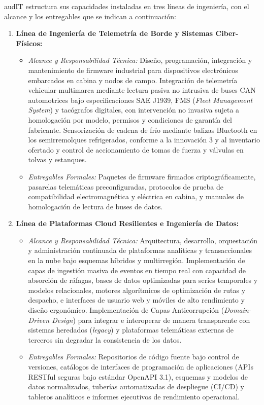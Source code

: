 audIT estructura sus capacidades instaladas en tres líneas de ingeniería, con el alcance y los entregables que se indican a continuación:

\begin{enumerate}
  \item \textbf{Línea de Ingeniería de Telemetría de Borde y Sistemas Ciber-Físicos:}
  \begin{itemize}
    \item \textit{Alcance y Responsabilidad Técnica:} Diseño, programación, integración y mantenimiento de firmware industrial para dispositivos electrónicos embarcados en cabina y nodos de campo. Integración de telemetría vehicular multimarca mediante lectura pasiva no intrusiva de buses CAN automotrices bajo especificaciones SAE J1939, FMS (\textit{Fleet Management System}) y tacógrafos digitales, con intervención no invasiva sujeta a homologación por modelo, permisos y condiciones de garantía del fabricante. Sensorización de cadena de frío mediante balizas Bluetooth en los semirremolques refrigerados, conforme a la innovación 3 y al inventario ofertado y control de accionamiento de tomas de fuerza y válvulas en tolvas y estanques.
    \item \textit{Entregables Formales:} Paquetes de firmware firmados criptográficamente, pasarelas telemáticas preconfiguradas, protocolos de prueba de compatibilidad electromagnética y eléctrica en cabina, y manuales de homologación de lectura de buses de datos.
  \end{itemize}

  \item \textbf{Línea de Plataformas Cloud Resilientes e Ingeniería de Datos:}
  \begin{itemize}
    \item \textit{Alcance y Responsabilidad Técnica:} Arquitectura, desarrollo, orquestación y administración continuada de plataformas analíticas y transaccionales en la nube bajo esquemas híbridos y multirregión. Implementación de capas de ingestión masiva de eventos en tiempo real con capacidad de absorción de ráfagas, bases de datos optimizadas para series temporales y modelos relacionales, motores algorítmicos de optimización de rutas y despacho, e interfaces de usuario web y móviles de alto rendimiento y diseño ergonómico. Implementación de Capas Anticorrupción (\textit{Domain-Driven Design}) para integrar e interoperar de manera transparente con sistemas heredados (\textit{legacy}) y plataformas telemáticas externas de terceros sin degradar la consistencia de los datos.
    \item \textit{Entregables Formales:} Repositorios de código fuente bajo control de versiones, catálogos de interfaces de programación de aplicaciones (APIs RESTful seguras bajo estándar OpenAPI 3.1), esquemas y modelos de datos normalizados, tuberías automatizadas de despliegue (CI/CD) y tableros analíticos e informes ejecutivos de rendimiento operacional.
  \end{itemize}


\end{enumerate}
